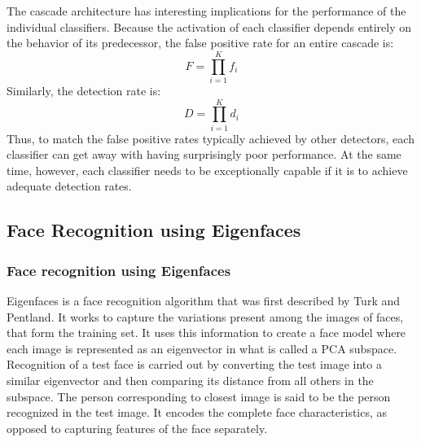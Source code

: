 \documentclass[%
        final,
        internal,
        notitlepage,
        narroweqnarray,
        inline,
        ]{ieee}
\begin{document}
The cascade architecture has interesting implications for the performance of the individual classifiers. Because the activation of each classifier depends entirely on the behavior of its predecessor, the false positive rate for an entire cascade is:
\begin{equation}
F = \prod _{i=1}^{K} f_i
\end{equation}
Similarly, the detection rate is:
\begin{equation}
D = \prod _{i=1}^{K} d_i
\end{equation}
Thus, to match the false positive rates typically achieved by other detectors, each classifier can get away with having surprisingly poor performance. At the same time, however, each classifier needs to be exceptionally capable if it is to achieve adequate detection rates.

\subsection{Face Recognition using Eigenfaces}

\subsubsection{Face recognition using Eigenfaces}
Eigenfaces is a face recognition algorithm that was first described by Turk and Pentland\cite{Turk91}. It works to capture the variations present among the images of faces, that form the training set. It uses this information to create a face model where each image is represented as an eigenvector in what is called a PCA subspace. Recognition of a test face is carried out by converting the test image into a similar eigenvector and then comparing its distance from all others in the subspace. The person corresponding to closest image is said to be the person recognized in the test image. It encodes the complete face characteristics, as opposed to capturing features of the face separately.\\
\end{document}
